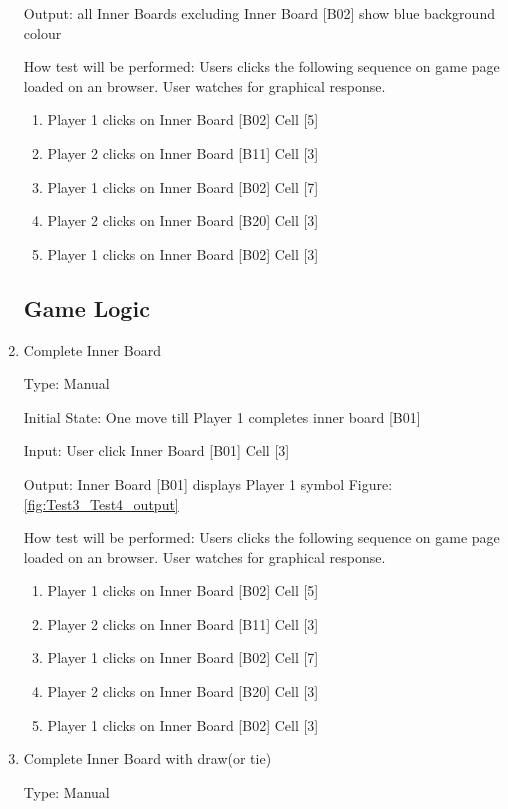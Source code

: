 \documentclass[12pt, titlepage]{article}
\begin{document}
\begin{enumerate}
Output:  all Inner Boards excluding Inner Board [B02] show blue background colour
					
How test will be performed: Users clicks the following sequence on game page
loaded on an browser. User watches for graphical response.
\begin{enumerate}
	\item Player 1 clicks on Inner Board [B02] Cell [5]
	\item Player 2 clicks on Inner Board [B11] Cell [3]
	\item Player 1 clicks on Inner Board [B02] Cell [7]
	\item Player 2 clicks on Inner Board [B20] Cell [3]
	\item Player 1 clicks on Inner Board [B02] Cell [3]
\end{enumerate}


\subsection{Game Logic}

\item{Complete Inner Board\\}

Type: Manual
					
Initial State: One move till Player 1 completes inner board [B01]
					
Input: User click Inner Board [B01] Cell [3] 
					
Output:  Inner Board [B01] displays Player 1 symbol Figure: \ref{fig:Test3_Test4_output}
					
How test will be performed: Users clicks the following sequence on game page
loaded on an browser. User watches for graphical response.
\begin{enumerate}
	\item Player 1 clicks on Inner Board [B02] Cell [5]
	\item Player 2 clicks on Inner Board [B11] Cell [3]
	\item Player 1 clicks on Inner Board [B02] Cell [7]
	\item Player 2 clicks on Inner Board [B20] Cell [3]
	\item Player 1 clicks on Inner Board [B02] Cell [3]
\end{enumerate}

\item{Complete Inner Board with draw(or tie) \\}

Type: Manual
					

\end{enumerate}
\end{document}

